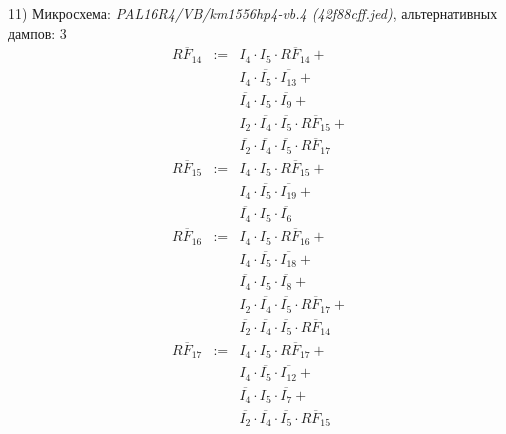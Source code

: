 \documentclass[a4paper,russian]{report}
\begin{document}
11) Микросхема: \emph{PAL16R4/VB/km1556hp4-vb.4  (42f88cff.jed)}, альтернативных дампов: 3
\nopagebreak\begin{eqnarray*}
    \overline{RF_{14}} & := & I_{4} \cdotp I_{5} \cdotp \overline{RF_{14}} + \\
	& &  I_{4} \cdotp \overline{I_{5}} \cdotp \overline{I_{13}} + \\
	& &  \overline{I_{4}} \cdotp I_{5} \cdotp \overline{I_{9}} + \\
	& &  I_{2} \cdotp \overline{I_{4}} \cdotp \overline{I_{5}} \cdotp \overline{RF_{15}} + \\
	& &  \overline{I_{2}} \cdotp \overline{I_{4}} \cdotp \overline{I_{5}} \cdotp \overline{RF_{17}} \\
    \overline{RF_{15}} & := & I_{4} \cdotp I_{5} \cdotp \overline{RF_{15}} + \\
	& &  I_{4} \cdotp \overline{I_{5}} \cdotp \overline{I_{19}} + \\
	& &  \overline{I_{4}} \cdotp I_{5} \cdotp \overline{I_{6}} \\
    \overline{RF_{16}} & := & I_{4} \cdotp I_{5} \cdotp \overline{RF_{16}} + \\
	& &  I_{4} \cdotp \overline{I_{5}} \cdotp \overline{I_{18}} + \\
	& &  \overline{I_{4}} \cdotp I_{5} \cdotp \overline{I_{8}} + \\
	& &  I_{2} \cdotp \overline{I_{4}} \cdotp \overline{I_{5}} \cdotp \overline{RF_{17}} + \\
	& &  \overline{I_{2}} \cdotp \overline{I_{4}} \cdotp \overline{I_{5}} \cdotp \overline{RF_{14}} \\
    \overline{RF_{17}} & := & I_{4} \cdotp I_{5} \cdotp \overline{RF_{17}} + \\
	& &  I_{4} \cdotp \overline{I_{5}} \cdotp \overline{I_{12}} + \\
	& &  \overline{I_{4}} \cdotp I_{5} \cdotp \overline{I_{7}} + \\
	& &  \overline{I_{2}} \cdotp \overline{I_{4}} \cdotp \overline{I_{5}} \cdotp \overline{RF_{15}} \\
 \end{eqnarray*}
\pagebreak[1]
\end{document}
